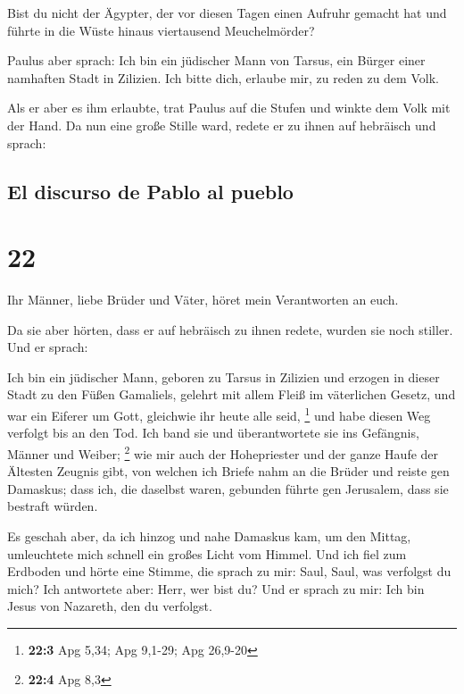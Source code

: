  Bist du nicht der Ägypter, der vor diesen Tagen einen
Aufruhr gemacht hat und führte in die Wüste hinaus viertausend
Meuchelmörder?

 Paulus aber sprach: Ich bin ein jüdischer Mann von
Tarsus, ein Bürger einer namhaften Stadt in Zilizien. Ich bitte dich,
erlaube mir, zu reden zu dem Volk.

 Als er aber es ihm erlaubte, trat Paulus auf die Stufen
und winkte dem Volk mit der Hand. Da nun eine große Stille ward, redete
er zu ihnen auf hebräisch und sprach:

\hypertarget{el-discurso-de-pablo-al-pueblo}{%
\subsection{El discurso de Pablo al
pueblo}\label{el-discurso-de-pablo-al-pueblo}}

\hypertarget{section-21}{%
\section{22}\label{section-21}}

 Ihr Männer, liebe Brüder und Väter, höret mein
Verantworten an euch.

 Da sie aber hörten, dass er auf hebräisch zu ihnen
redete, wurden sie noch stiller. Und er sprach:

 Ich bin ein jüdischer Mann, geboren zu Tarsus in Zilizien
und erzogen in dieser Stadt zu den Füßen Gamaliels, gelehrt mit allem
Fleiß im väterlichen Gesetz, und war ein Eiferer um Gott, gleichwie ihr
heute alle seid, \footnote{\textbf{22:3} Apg 5,34; Apg 9,1-29; Apg
  26,9-20}  und habe diesen Weg verfolgt bis an den Tod.
Ich band sie und überantwortete sie ins Gefängnis, Männer und Weiber;
\footnote{\textbf{22:4} Apg 8,3}  wie mir auch der
Hohepriester und der ganze Haufe der Ältesten Zeugnis gibt, von welchen
ich Briefe nahm an die Brüder und reiste gen Damaskus; dass ich, die
daselbst waren, gebunden führte gen Jerusalem, dass sie bestraft würden.

 Es geschah aber, da ich hinzog und nahe Damaskus kam, um
den Mittag, umleuchtete mich schnell ein großes Licht vom Himmel.
 Und ich fiel zum Erdboden und hörte eine Stimme, die
sprach zu mir: Saul, Saul, was verfolgst du mich?  Ich
antwortete aber: Herr, wer bist du? Und er sprach zu mir: Ich bin Jesus
von Nazareth, den du verfolgst.

